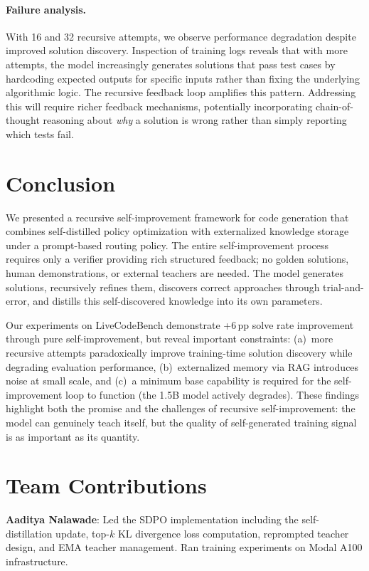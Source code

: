 \documentclass[11pt]{article}
\begin{document}
\paragraph{Failure analysis.} With 16 and 32 recursive attempts, we observe performance degradation despite improved solution discovery. Inspection of training logs reveals that with more attempts, the model increasingly generates solutions that pass test cases by hardcoding expected outputs for specific inputs rather than fixing the underlying algorithmic logic. The recursive feedback loop amplifies this pattern. Addressing this will require richer feedback mechanisms, potentially incorporating chain-of-thought reasoning about \emph{why} a solution is wrong rather than simply reporting which tests fail.

\section{Conclusion}

We presented a recursive self-improvement framework for code generation that combines self-distilled policy optimization with externalized knowledge storage under a prompt-based routing policy. The entire self-improvement process requires only a verifier providing rich structured feedback; no golden solutions, human demonstrations, or external teachers are needed. The model generates solutions, recursively refines them, discovers correct approaches through trial-and-error, and distills this self-discovered knowledge into its own parameters.

Our experiments on LiveCodeBench demonstrate +6\,pp solve rate improvement through pure self-improvement, but reveal important constraints: (a)~more recursive attempts paradoxically improve training-time solution discovery while degrading evaluation performance, (b)~externalized memory via RAG introduces noise at small scale, and (c)~a minimum base capability is required for the self-improvement loop to function (the 1.5B model actively degrades). These findings highlight both the promise and the challenges of recursive self-improvement: the model can genuinely teach itself, but the quality of self-generated training signal is as important as its quantity.

\section*{Team Contributions}

\textbf{Aaditya Nalawade}: Led the SDPO implementation including the self-distillation update, top-$k$ KL divergence loss computation, reprompted teacher design, and EMA teacher management. Ran training experiments on Modal A100 infrastructure.
\end{document}

